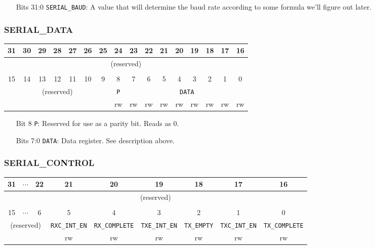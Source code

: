 \documentclass[11pt,openany]{report}
\begin{document}
\begin{enumerate}
\item[Bits 31:0] \verb|SERIAL_BAUD|: A value that will determine the baud
rate according to some formula we'll figure out later.
\end{enumerate}

\subsubsection{SERIAL\_DATA}

\begin{center}
  \begin{tabular}{|c|c|c|c|c|c|c|c|c|c|c|c|c|c|c|c|}
    \hline
    31 & 30 & 29 & 28 & 27 & 26 & 25 & 24 & 23 & 22 & 21 & 20 & 19 & 18 & 17 & 16 \\
    \hline
    \multicolumn{16}{|c|}{\multirow{2}{*}{(reserved)}}\\
    \multicolumn{16}{|c|}{}\\
    \hline
    \multicolumn{16}{c}{}\\
    \hline
    15 & 14 & 13 & 12 & 11 & 10 & 9 & 8 & 7 & 6 & 5 & 4 & 3 & 2 & 1 & 0 \\
    \hline
    \multicolumn{7}{|c|}{\multirow{2}{*}{(reserved)}} & \texttt{P} & \multicolumn{8}{c|}{\texttt{DATA}}\\
    \cline{8-16}
    \multicolumn{7}{|c|}{} & rw & rw & rw & rw & rw & rw & rw & rw & rw\\
    \hline
  \end{tabular}
\end{center}

\begin{enumerate}
\item[Bit 8] \verb|P|: Reserved for use as a parity bit. Reads as 0.
\item[Bits 7:0] \verb|DATA|: Data register. See description above.
\end{enumerate}

\subsubsection{SERIAL\_CONTROL}
\begin{center}
  \begin{tabular}{|c|c|c|c|c|c|c|c|c|}
    \hline
    31 & $\cdots$ & 22 & 21 & 20 & 19 & 18 & 17 & 16 \\
    \hline
    \multicolumn{9}{|c|}{\multirow{2}{*}{(reserved)}}\\
    \multicolumn{9}{|c|}{}\\
    \hline
    \multicolumn{9}{c}{}\\
    \hline
    15 & $\cdots$ & 6 & 5 & 4 & 3 & 2 & 1 & 0 \\
    \hline
    \multicolumn{3}{|c|}{\multirow{2}{*}{(reserved)}} & \texttt{RXC\_INT\_EN} & \texttt{RX\_COMPLETE} & \texttt{TXE\_INT\_EN} & \texttt{TX\_EMPTY} & \texttt{TXC\_INT\_EN} & \texttt{TX\_COMPLETE} \\
    \cline{4-9}
    \multicolumn{3}{|c|}{} & rw & rw & rw & rw & rw & rw\\
    \hline
  \end{tabular}
\end{center}
\end{document}
